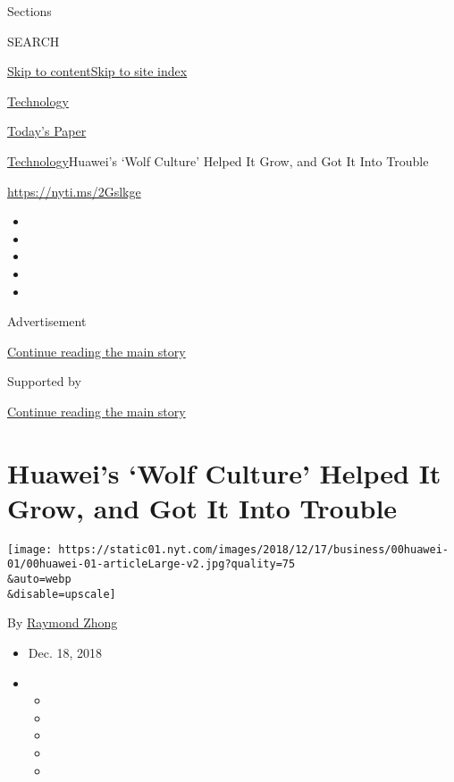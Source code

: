 Sections

SEARCH

\protect\hyperlink{site-content}{Skip to
content}\protect\hyperlink{site-index}{Skip to site index}

\href{https://www.nytimes.com/section/technology}{Technology}

\href{https://myaccount.nytimes.com/auth/login?response_type=cookie\&client_id=vi}{}

\href{https://www.nytimes.com/section/todayspaper}{Today's Paper}

\href{/section/technology}{Technology}\textbar{}Huawei's `Wolf Culture'
Helped It Grow, and Got It Into Trouble

\url{https://nyti.ms/2Gslkge}

\begin{itemize}
\item
\item
\item
\item
\item
\end{itemize}

Advertisement

\protect\hyperlink{after-top}{Continue reading the main story}

Supported by

\protect\hyperlink{after-sponsor}{Continue reading the main story}

\hypertarget{huaweis-wolf-culture-helped-it-grow-and-got-it-into-trouble}{%
\section{Huawei's `Wolf Culture' Helped It Grow, and Got It Into
Trouble}\label{huaweis-wolf-culture-helped-it-grow-and-got-it-into-trouble}}

\texttt{[image: https://static01.nyt.com/images/2018/12/17/business/00huawei-01/00huawei-01-articleLarge-v2.jpg?quality=75\\\&auto=webp\\\&disable=upscale]}

By \href{https://www.nytimes.com/by/raymond-zhong}{Raymond Zhong}

\begin{itemize}
\item
  Dec. 18, 2018
\item
  \begin{itemize}
  \item
  \item
  \item
  \item
  \item
  \end{itemize}
\end{itemize}

